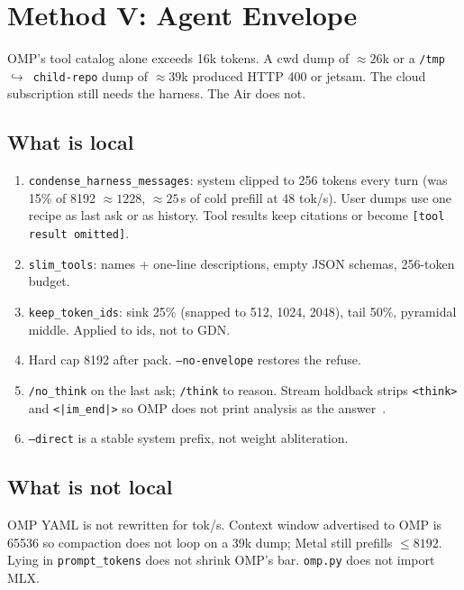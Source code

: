\section{Method V: Agent Envelope}
\label{sec:envelope}

OMP's tool catalog alone exceeds 16k tokens. A cwd dump of $\approx 26$k or a \texttt{/tmp $\hookrightarrow$ child-repo} dump of $\approx 39$k produced HTTP 400 or jetsam. The cloud subscription still needs the harness. The Air does not.

\subsection{What is local}

\begin{enumerate}[leftmargin=1.4em]
\item \texttt{condense\_harness\_messages}: system clipped to 256 tokens every turn (was 15\% of 8192 $\approx 1228$, $\approx 25$\,s of cold prefill at 48 tok/s). User dumps use one recipe as last ask or as history. Tool results keep citations or become \texttt{[tool result omitted]}.
\item \texttt{slim\_tools}: names + one-line descriptions, empty JSON schemas, 256-token budget.
\item \texttt{keep\_token\_ids}: sink 25\% (snapped to 512, 1024, 2048), tail 50\%, pyramidal middle. Applied to ids, not to GDN.
\item Hard cap 8192 after pack. \texttt{--no-envelope} restores the refuse.
\item \texttt{/no\_think} on the last ask; \texttt{/think} to reason. Stream holdback strips \texttt{<think>} and \texttt{<|im\_end|>} so OMP does not print analysis as the answer~\citep{qwen38card}.
\item \texttt{--direct} is a stable system prefix, not weight abliteration.
\end{enumerate}

\subsection{What is not local}

OMP YAML is not rewritten for tok/s. Context window advertised to OMP is 65536 so compaction does not loop on a 39k dump; Metal still prefills $\le 8192$. Lying in \texttt{prompt\_tokens} does not shrink OMP's bar. \texttt{omp.py} does not import MLX.

